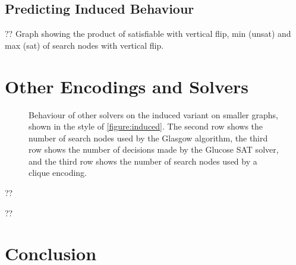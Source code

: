\documentclass[letterpaper]{article}
\begin{document}
\subsection{Predicting Induced Behaviour}

?? Graph showing the product of satisfiable with vertical flip, min (unsat) and max (sat) of search
nodes with vertical flip.

\section{Other Encodings and Solvers}

\begin{figure*}
    \hskip-1.2cm
    \setlength{\abovecaptionskip}{-2em}
    \caption{Behaviour of other solvers on the induced variant on smaller graphs, shown in the style of
        \cref{figure:induced}. The second row shows the number of search nodes used by the Glasgow
        algorithm, the third row shows the number of decisions made by the Glucose SAT solver, and
        the third row shows the number of search nodes used by a clique encoding.}
\end{figure*}

?? \cite{Anton:2009}

?? \cite{Lipets:2009}

\section{Conclusion}



\end{document}
